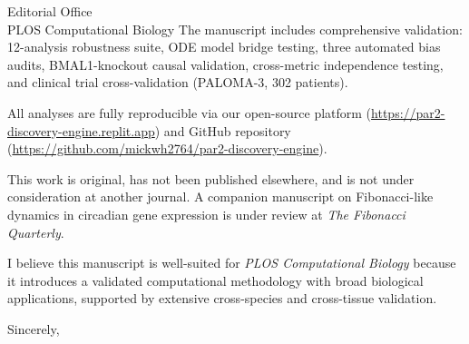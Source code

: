 \documentclass[11pt,letterpaper]{letter}
\begin{document}
\begin{letter}{Editorial Office \\ PLOS Computational Biology}
The manuscript includes comprehensive validation: 12-analysis robustness suite, ODE model bridge testing, three automated bias audits, BMAL1-knockout causal validation, cross-metric independence testing, and clinical trial cross-validation (PALOMA-3, 302 patients).

All analyses are fully reproducible via our open-source platform (\url{https://par2-discovery-engine.replit.app}) and GitHub repository (\url{https://github.com/mickwh2764/par2-discovery-engine}).

This work is original, has not been published elsewhere, and is not under consideration at another journal. A companion manuscript on Fibonacci-like dynamics in circadian gene expression is under review at \textit{The Fibonacci Quarterly}.

I believe this manuscript is well-suited for \textit{PLOS Computational Biology} because it introduces a validated computational methodology with broad biological applications, supported by extensive cross-species and cross-tissue validation.

\closing{Sincerely,}

\end{letter}
\end{document}
